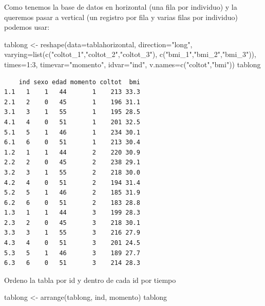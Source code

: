 \documentclass[
]{book}
\newenvironment{Shaded}{\begin{snugshade}}{\end{snugshade}}
\newcommand{\AttributeTok}[1]{\textcolor[rgb]{0.77,0.63,0.00}{#1}}
\newcommand{\DecValTok}[1]{\textcolor[rgb]{0.00,0.00,0.81}{#1}}
\newcommand{\FunctionTok}[1]{\textcolor[rgb]{0.00,0.00,0.00}{#1}}
\newcommand{\NormalTok}[1]{#1}
\newcommand{\OtherTok}[1]{\textcolor[rgb]{0.56,0.35,0.01}{#1}}
\newcommand{\SpecialCharTok}[1]{\textcolor[rgb]{0.00,0.00,0.00}{#1}}
\newcommand{\StringTok}[1]{\textcolor[rgb]{0.31,0.60,0.02}{#1}}
\begin{document}
Como tenemos la base de datos en horizontal (una fila por individuo) y la queremos pasar a vertical (un registro por fila y varias filas por individuo) podemos usar:

\begin{Shaded}
\begin{Highlighting}[]
\NormalTok{tablong }\OtherTok{\textless{}{-}} \FunctionTok{reshape}\NormalTok{(}\AttributeTok{data=}\NormalTok{tablahorizontal, }
                   \AttributeTok{direction=}\StringTok{"long"}\NormalTok{, }
                   \AttributeTok{varying=}\FunctionTok{list}\NormalTok{(}\FunctionTok{c}\NormalTok{(}\StringTok{"coltot\_1"}\NormalTok{,}\StringTok{"coltot\_2"}\NormalTok{,}\StringTok{"coltot\_3"}\NormalTok{),}
                                \FunctionTok{c}\NormalTok{(}\StringTok{"bmi\_1"}\NormalTok{,}\StringTok{"bmi\_2"}\NormalTok{,}\StringTok{"bmi\_3"}\NormalTok{)), }
                   \AttributeTok{times=}\DecValTok{1}\SpecialCharTok{:}\DecValTok{3}\NormalTok{, }
                   \AttributeTok{timevar=}\StringTok{"momento"}\NormalTok{, }
                   \AttributeTok{idvar=}\StringTok{"ind"}\NormalTok{,}
                   \AttributeTok{v.names=}\FunctionTok{c}\NormalTok{(}\StringTok{"coltot"}\NormalTok{,}\StringTok{"bmi"}\NormalTok{))}
\NormalTok{tablong}
\end{Highlighting}
\end{Shaded}

\begin{verbatim}
    ind sexo edad momento coltot  bmi
1.1   1    1   44       1    213 33.3
2.1   2    0   45       1    196 31.1
3.1   3    1   55       1    195 28.5
4.1   4    0   51       1    201 32.5
5.1   5    1   46       1    234 30.1
6.1   6    0   51       1    213 30.4
1.2   1    1   44       2    220 30.9
2.2   2    0   45       2    238 29.1
3.2   3    1   55       2    218 30.0
4.2   4    0   51       2    194 31.4
5.2   5    1   46       2    185 31.9
6.2   6    0   51       2    183 28.8
1.3   1    1   44       3    199 28.3
2.3   2    0   45       3    218 30.1
3.3   3    1   55       3    216 27.9
4.3   4    0   51       3    201 24.5
5.3   5    1   46       3    189 27.7
6.3   6    0   51       3    214 28.3
\end{verbatim}

Ordeno la tabla por id y dentro de cada id por tiempo

\begin{Shaded}
\begin{Highlighting}[]
\NormalTok{tablong }\OtherTok{\textless{}{-}} \FunctionTok{arrange}\NormalTok{(tablong, ind, momento)}
\NormalTok{tablong}
\end{Highlighting}
\end{Shaded}
\end{document}
